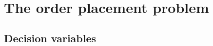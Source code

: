 \documentclass[opre,nonblindrev]{informs3}
\begin{document}


\newpage
\section{The order placement problem}\label{sec.routing}
\subsection{Decision variables}
\end{document}
